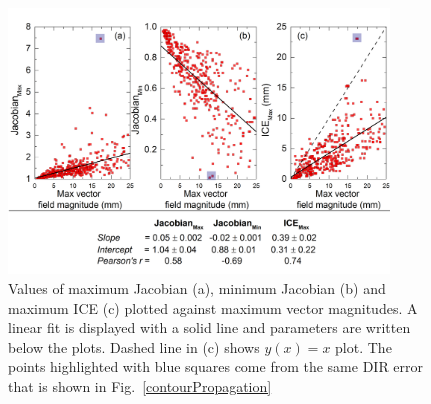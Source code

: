 \documentclass[type=dr, dr=rernat, accentcolor=tud7b,colorbacktitle, bigchapter, openright, twoside, 12pt ]{tudthesis}
\begin{document}
\newpage





\newpage

\begin{figure}[H]
	\begin{center}		
		\includegraphics[width=0.9\textwidth]{./Images/maxVf_lung.png}
		\caption{Values of maximum Jacobian (a), minimum Jacobian (b) and maximum ICE (c) plotted against maximum vector magnitudes. A linear fit is displayed with a solid line and parameters are written below the plots. Dashed line in (c) shows $y(x)= x$ plot.
			The points highlighted with blue squares come from the same DIR error that is shown in Fig.~\ref{contourPropagation}}
		\label{maxvf}
	\end{center}
\end{figure}
\end{document}
